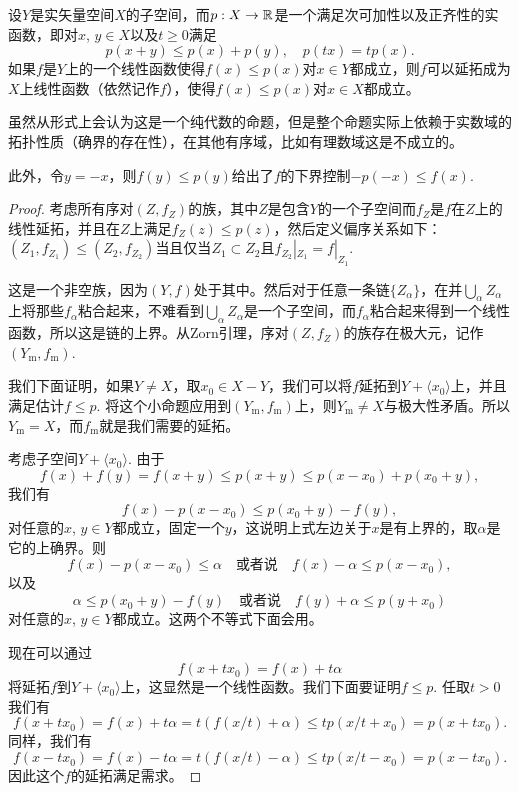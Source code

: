 \begin{thm}
设$Y$是实矢量空间$X$的子空间，而$p:X\to \mathbb{R}$是一个满足次可加性以及正齐性的实函数，即对$x$, $y\in X$以及$t\geq 0$满足
\[
	p(x+y)\leq p(x)+p(y),\quad p(tx)=tp(x).
\]
如果$f$是$Y$上的一个线性函数使得$f(x)\leq p(x)$对$x\in Y$都成立，则$f$可以延拓成为$X$上线性函数（依然记作$f$），使得$f(x)\leq p(x)$对$x\in X$都成立。
\end{thm}

虽然从形式上会认为这是一个纯代数的命题，但是整个命题实际上依赖于实数域的拓扑性质（确界的存在性），在其他有序域，比如有理数域这是不成立的。

此外，令$y=-x$，则$f(y)\leq p(y)$给出了$f$的下界控制$-p(-x)\leq f(x)$.

\begin{proof}
	考虑所有序对$(Z,f_Z)$的族，其中$Z$是包含$Y$的一个子空间而$f_Z$是$f$在$Z$上的线性延拓，并且在$Z$上满足$f_Z(z)\leq p(z)$，然后定义偏序关系如下：$(Z_1,f_{Z_1})\leq (Z_2,f_{Z_2})$当且仅当$Z_1\subset Z_2$且$f_{Z_2}|_{Z_1}=f|_{Z_1}$. 

	这是一个非空族，因为$(Y,f)$处于其中。然后对于任意一条链$\{Z_\alpha\}$，在并$\bigcup_\alpha Z_\alpha$上将那些$f_{\alpha}$粘合起来，不难看到$\bigcup_\alpha Z_\alpha$是一个子空间，而$f_{\alpha}$粘合起来得到一个线性函数，所以这是链的上界。从Zorn引理，序对$(Z,f_Z)$的族存在极大元，记作$(Y_{\text{m}},f_{\text{m}})$.

	我们下面证明，如果$Y\neq X$，取$x_0\in X-Y$，我们可以将$f$延拓到$Y+\langle x_0\rangle$上，并且满足估计$f\leq p$. 将这个小命题应用到$(Y_{\text{m}},f_{\text{m}})$上，则$Y_{\text{m}}\neq X$与极大性矛盾。所以$Y_{\text{m}}=X$，而$f_{\text{m}}$就是我们需要的延拓。

	考虑子空间$Y+\langle x_0\rangle$. 由于
	\[
	f(x)+f(y)=f(x+y)\leq p(x+y)\leq p(x-x_0)+p(x_0+y),
	\]
	我们有
	\[
	f(x)-p(x-x_0)\leq p(x_0+y)-f(y),
	\]
	对任意的$x$, $y\in Y$都成立，固定一个$y$，这说明上式左边关于$x$是有上界的，取$\alpha$是它的上确界。则
	\[
	f(x)-p(x-x_0)\leq \alpha \quad \text{或者说}\quad f(x)-\alpha\leq p(x-x_0),
	\]
	以及
	\[
	\alpha \leq p(x_0+y)-f(y) \quad \text{或者说}\quad f(y)+\alpha \leq p(y+x_0)
	\]
	对任意的$x$, $y\in Y$都成立。这两个不等式下面会用。

	现在可以通过
	\[
	f(x+tx_0)=f(x)+t\alpha
	\]
	将延拓$f$到$Y+\langle x_0\rangle$上，这显然是一个线性函数。我们下面要证明$f\leq p$. 任取$t>0$我们有
	\[
	f(x+tx_0)=f(x)+t\alpha=t(f(x/t)+\alpha)\leq t p(x/t+x_0)= p(x+tx_0).
	\]
	同样，我们有
	\[
	f(x-tx_0)=f(x)-t\alpha=t(f(x/t)-\alpha)\leq t p(x/t-x_0)=p(x-tx_0).
	\]
	因此这个$f$的延拓满足需求。
\end{proof}


